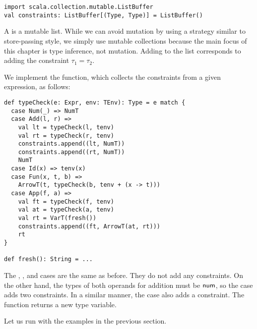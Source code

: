 \begin{verbatim}
import scala.collection.mutable.ListBuffer
val constraints: ListBuffer[(Type, Type)] = ListBuffer()
\end{verbatim}

A  is a mutable list. While we can avoid mutation by using a
strategy similar to store-passing style, we simply use mutable collections
because the main focus of this chapter is type inference, not mutation. Adding
 to the list corresponds to adding the constraint
$\tau_1=\tau_2$.

We implement the  function, which collects the constraints
from a given expression, as follows:

\begin{verbatim}
def typeCheck(e: Expr, env: TEnv): Type = e match {
  case Num(_) => NumT
  case Add(l, r) =>
    val lt = typeCheck(l, tenv)
    val rt = typeCheck(r, tenv)
    constraints.append((lt, NumT))
    constraints.append((rt, NumT))
    NumT
  case Id(x) => tenv(x)
  case Fun(x, t, b) =>
    ArrowT(t, typeCheck(b, tenv + (x -> t)))
  case App(f, a) =>
    val ft = typeCheck(f, tenv)
    val at = typeCheck(a, tenv)
    val rt = VarT(fresh())
    constraints.append((ft, ArrowT(at, rt)))
    rt
}

def fresh(): String = ...
\end{verbatim}

The , , and  cases are the same as before. They do
not add any constraints. On the other hand, the types of both operands for
addition must be $\textsf{num}$, so the  case adds two constraints. In a
similar manner, the  case also adds a constraint. The 
function returns a new type variable.

Let us run  with the examples in the previous section.

